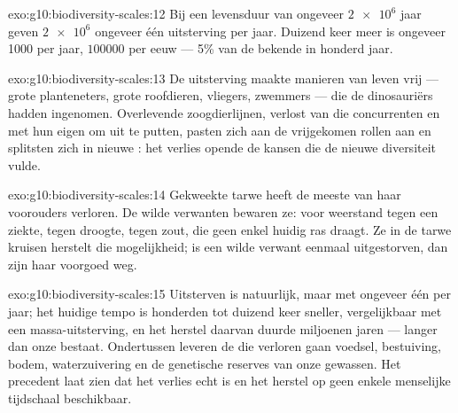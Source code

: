 \begin{solution}{exo:g10:biodiversity-scales:12}
Bij een levensduur van ongeveer $\num{2e6}$ jaar geven $\num{2e6}$
 ongeveer één uitsterving per jaar. Duizend keer meer is ongeveer
1000  per jaar, $\num{100000}$ per eeuw --- 5\% van de bekende
 in honderd jaar.
\end{solution}

\begin{solution}{exo:g10:biodiversity-scales:13}
De uitsterving maakte manieren van leven vrij --- grote planteneters,
grote roofdieren, vliegers, zwemmers --- die de dinosauriërs hadden
ingenomen. Overlevende zoogdierlijnen, verlost van die concurrenten en
met hun eigen  om uit te putten, pasten zich aan
de vrijgekomen rollen aan en splitsten zich in nieuwe : het
verlies opende de kansen die de nieuwe diversiteit vulde.
\end{solution}

\begin{solution}{exo:g10:biodiversity-scales:14}
Gekweekte tarwe heeft de meeste  van haar voorouders verloren. De
wilde verwanten bewaren ze:  voor weerstand tegen een ziekte,
tegen droogte, tegen zout, die geen enkel huidig ras draagt. Ze in de
tarwe kruisen herstelt die mogelijkheid; is een wilde verwant eenmaal
uitgestorven, dan zijn haar  voorgoed weg.
\end{solution}

\begin{solution}{exo:g10:biodiversity-scales:15}
Uitsterven is natuurlijk, maar met ongeveer één  per jaar; het
huidige tempo is honderden tot duizend keer sneller, vergelijkbaar met
een massa-uitsterving, en het herstel daarvan duurde miljoenen jaren ---
langer dan onze  bestaat. Ondertussen leveren de  die
verloren gaan voedsel, bestuiving, bodem, waterzuivering en de genetische
reserves van onze gewassen. Het precedent laat zien dat het verlies echt
is en het herstel op geen enkele menselijke tijdschaal beschikbaar.
\end{solution}

